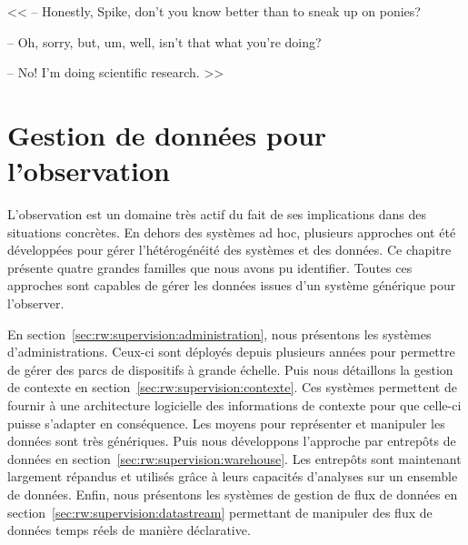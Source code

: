 \begin{savequote}[6cm]
<< -- Honestly, Spike, don't you know better than to sneak up on ponies?

-- Oh, sorry, but, um, well, isn't that what you're doing?

-- No! I'm doing scientific research. >>
\end{savequote}

\chapter{Gestion de données pour l'observation}\label{chap:rw:supervision}
\chaptertoc

L'observation est un domaine très actif du fait de ses implications dans des situations concrètes. En dehors des systèmes ad hoc, plusieurs approches ont été développées pour gérer l'hétérogénéité des systèmes et des données. Ce chapitre présente quatre grandes familles que nous avons pu identifier. Toutes ces approches sont capables de gérer les données issues d'un système générique pour l'observer.

En section~\ref{sec:rw:supervision:administration}, nous présentons les systèmes d'administrations. Ceux-ci sont déployés depuis plusieurs années pour permettre de gérer des parcs de dispositifs à grande échelle. Puis nous détaillons la gestion de contexte en section~\ref{sec:rw:supervision:contexte}. Ces systèmes permettent de fournir à une architecture logicielle des informations de contexte pour que celle-ci puisse s'adapter en conséquence. Les moyens pour représenter et manipuler les données sont très génériques. Puis nous développons l'approche par entrepôts de données en section~\ref{sec:rw:supervision:warehouse}. Les entrepôts sont maintenant largement répandus et utilisés grâce à leurs capacités d'analyses sur un ensemble de données. Enfin, nous présentons les systèmes de gestion de flux de données en section~\ref{sec:rw:supervision:datastream} permettant de manipuler des flux de données temps réels de manière déclarative.







